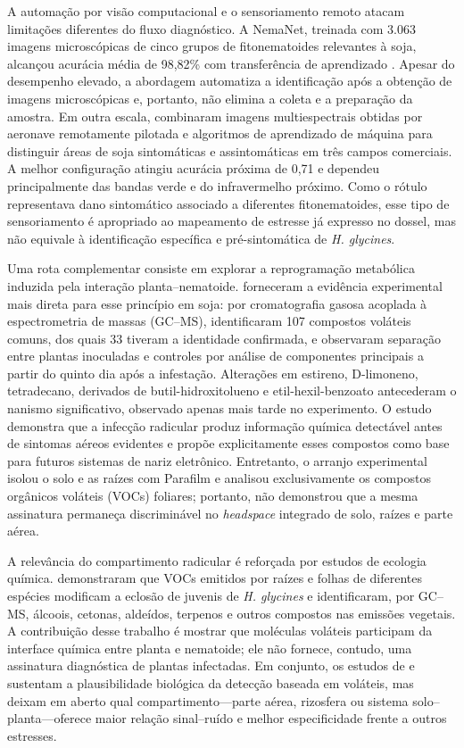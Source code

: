 \documentclass[12pt,a4paper]{article}
\begin{document}
A automação por visão computacional e o sensoriamento remoto atacam limitações diferentes do fluxo diagnóstico. A NemaNet, treinada com 3.063 imagens microscópicas de cinco grupos de fitonematoides relevantes à soja, alcançou acurácia média de 98,82\% com transferência de aprendizado \cite{abade2022}. Apesar do desempenho elevado, a abordagem automatiza a identificação após a obtenção de imagens microscópicas e, portanto, não elimina a coleta e a preparação da amostra. Em outra escala, \citet{santos2022} combinaram imagens multiespectrais obtidas por aeronave remotamente pilotada e algoritmos de aprendizado de máquina para distinguir áreas de soja sintomáticas e assintomáticas em três campos comerciais. A melhor configuração atingiu acurácia próxima de 0,71 e dependeu principalmente das bandas verde e do infravermelho próximo. Como o rótulo representava dano sintomático associado a diferentes fitonematoides, esse tipo de sensoriamento é apropriado ao mapeamento de estresse já expresso no dossel, mas não equivale à identificação específica e pré-sintomática de \textit{H. glycines}.

Uma rota complementar consiste em explorar a reprogramação metabólica induzida pela interação planta--nematoide. \citet{constantino2021} forneceram a evidência experimental mais direta para esse princípio em soja: por cromatografia gasosa acoplada à espectrometria de massas (GC--MS), identificaram 107 compostos voláteis comuns, dos quais 33 tiveram a identidade confirmada, e observaram separação entre plantas inoculadas e controles por análise de componentes principais a partir do quinto dia após a infestação. Alterações em estireno, D-limoneno, tetradecano, derivados de butil-hidroxitolueno e etil-hexil-benzoato antecederam o nanismo significativo, observado apenas mais tarde no experimento. O estudo demonstra que a infecção radicular produz informação química detectável antes de sintomas aéreos evidentes e propõe explicitamente esses compostos como base para futuros sistemas de nariz eletrônico. Entretanto, o arranjo experimental isolou o solo e as raízes com Parafilm e analisou exclusivamente os compostos orgânicos voláteis (VOCs) foliares; portanto, não demonstrou que a mesma assinatura permaneça discriminável no \textit{headspace} integrado de solo, raízes e parte aérea.

A relevância do compartimento radicular é reforçada por estudos de ecologia química. \citet{velloso2021} demonstraram que VOCs emitidos por raízes e folhas de diferentes espécies modificam a eclosão de juvenis de \textit{H. glycines} e identificaram, por GC--MS, álcoois, cetonas, aldeídos, terpenos e outros compostos nas emissões vegetais. A contribuição desse trabalho é mostrar que moléculas voláteis participam da interface química entre planta e nematoide; ele não fornece, contudo, uma assinatura diagnóstica de plantas infectadas. Em conjunto, os estudos de \citet{constantino2021} e \citet{velloso2021} sustentam a plausibilidade biológica da detecção baseada em voláteis, mas deixam em aberto qual compartimento---parte aérea, rizosfera ou sistema solo--planta---oferece maior relação sinal--ruído e melhor especificidade frente a outros estresses.
\end{document}
